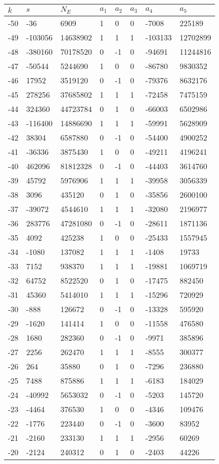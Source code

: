 \documentclass{amsart}
\begin{document}
\begin{longtable}{|l|l|l|lllll|}
\hline
$k$ & $s$ & $N_E$ & $a_1$ & $a_2$ & $a_3$ & $a_4$ & $a_5$\\
\hline
-50&-36&6909&1&0&0&-7008&225189\\
-49&-103056&14638902&1&1&1&-103133&12702899\\
-48&-380160&70178520&0&-1&0&-94691&11244816\\
-47&-50544&5244690&1&0&0&-86780&9830352\\
-46&17952&3519120&0&-1&0&-79376&8632176\\
-45&278256&37685802&1&1&1&-72458&7475159\\
-44&324360&44723784&0&1&0&-66003&6502986\\
-43&-116400&14886690&1&1&1&-59991&5628909\\
-42&38304&6587880&0&-1&0&-54400&4900252\\
-41&-36336&3875430&1&0&0&-49211&4196241\\
-40&462096&81812328&0&-1&0&-44403&3614760\\
-39&45792&5976906&1&1&1&-39958&3056339\\
-38&3096&435120&0&1&0&-35856&2600100\\
-37&-39072&4544610&1&1&1&-32080&2196977\\
-36&283776&47281080&0&-1&0&-28611&1871136\\
-35&4092&425238&1&0&0&-25433&1557945\\
-34&-1080&137082&1&1&1&-1408&19733\\
-33&7152&938370&1&1&1&-19881&1069719\\
-32&64752&8522520&0&1&0&-17475&882450\\
-31&45360&5414010&1&1&1&-15296&720929\\
-30&-888&126672&0&-1&0&-13328&595920\\
-29&-1620&141414&1&0&0&-11558&476580\\
-28&1680&282360&0&-1&0&-9971&385896\\
-27&2256&262470&1&1&1&-8555&300377\\
-26&264&35880&0&1&0&-7296&236880\\
-25&7488&875886&1&1&1&-6183&184029\\
-24&-40992&5653032&0&-1&0&-5203&145720\\
-23&-4464&376530&1&0&0&-4346&109476\\
-22&-1776&223440&0&-1&0&-3600&83952\\
-21&-2160&233130&1&1&1&-2956&60269\\
-20&-2124&240312&0&1&0&-2403&44226\\

\end{longtable}
\end{document}
